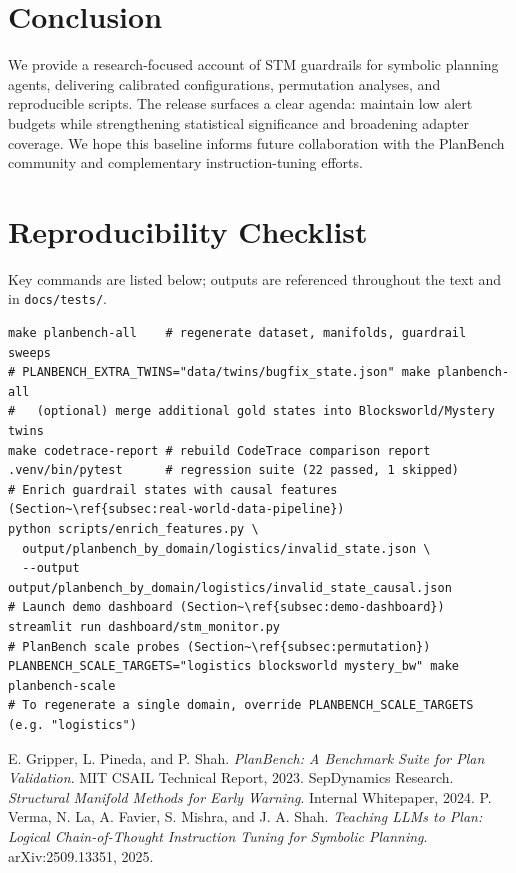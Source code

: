 \documentclass[11pt]{article}
\begin{document}
\section{Conclusion}
We provide a research-focused account of STM guardrails for symbolic planning
agents, delivering calibrated configurations, permutation analyses, and
reproducible scripts. The release surfaces a clear agenda: maintain low alert
budgets while strengthening statistical significance and broadening adapter
coverage. We hope this baseline informs future collaboration with the PlanBench
community and complementary instruction-tuning efforts.

\appendix

\section{Reproducibility Checklist}
Key commands are listed below; outputs are referenced throughout the text and in
\texttt{docs/tests/}.

\begin{lstlisting}[style=stm]
make planbench-all    # regenerate dataset, manifolds, guardrail sweeps
# PLANBENCH_EXTRA_TWINS="data/twins/bugfix_state.json" make planbench-all
#   (optional) merge additional gold states into Blocksworld/Mystery twins
make codetrace-report # rebuild CodeTrace comparison report
.venv/bin/pytest      # regression suite (22 passed, 1 skipped)
# Enrich guardrail states with causal features (Section~\ref{subsec:real-world-data-pipeline})
python scripts/enrich_features.py \
  output/planbench_by_domain/logistics/invalid_state.json \
  --output output/planbench_by_domain/logistics/invalid_state_causal.json
# Launch demo dashboard (Section~\ref{subsec:demo-dashboard})
streamlit run dashboard/stm_monitor.py
# PlanBench scale probes (Section~\ref{subsec:permutation})
PLANBENCH_SCALE_TARGETS="logistics blocksworld mystery_bw" make planbench-scale
# To regenerate a single domain, override PLANBENCH_SCALE_TARGETS (e.g. "logistics")
\end{lstlisting}

\begin{thebibliography}{9}
 E. Gripper, L. Pineda, and P. Shah. \emph{PlanBench: A Benchmark Suite for Plan Validation}. MIT CSAIL Technical Report, 2023.
\bibitem{stm-manifold} SepDynamics Research. \emph{Structural Manifold Methods for Early Warning}. Internal Whitepaper, 2024.
\bibitem{verma2025pddlinstruct} P. Verma, N. La, A. Favier, S. Mishra, and J. A. Shah. \emph{Teaching LLMs to Plan: Logical Chain-of-Thought Instruction Tuning for Symbolic Planning}. arXiv:2509.13351, 2025.
\end{thebibliography}
\end{document}
